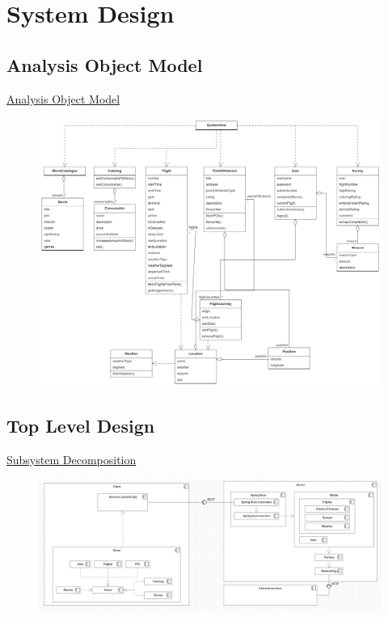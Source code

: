 \documentclass{beamer}
\begin{document}
\section{System Design}
\subsection{Analysis Object Model}
\begin{frame}{\href{run:../images/ObjectDiagram.png}{Analysis Object Model}}
	\begin{figure}
		\includegraphics[width=.8\textwidth]{../images/ObjectDiagram.png}
	\end{figure}
\end{frame}
\subsection{Top Level Design}
\begin{frame}{\href{run:../images/SubsystemDecomposition.PNG}{Subsystem Decomposition}}
	\begin{figure}
		\includegraphics[width=\textwidth]{../images/SubsystemDecomposition.PNG}
	\end{figure}
\end{frame}
\end{document}
